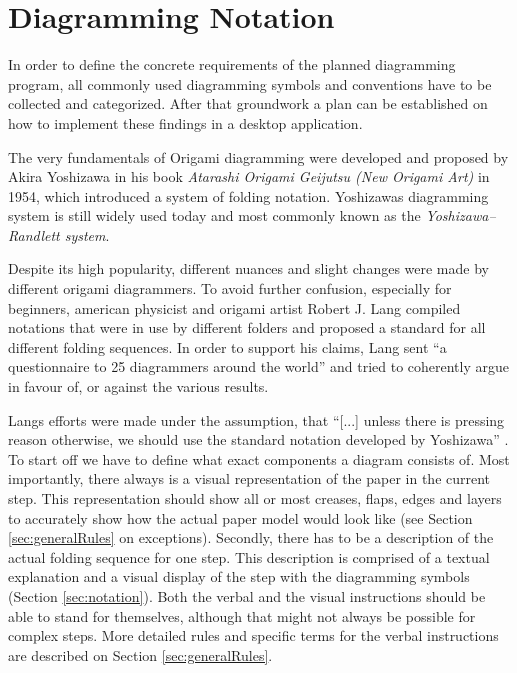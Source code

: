 
\section{Diagramming Notation}
\label{sec:conventions}


In order to define the concrete requirements of the planned diagramming program, all commonly used diagramming symbols and conventions have to be collected and categorized. After that groundwork a plan can be established on how to implement these findings in a desktop application.

The very fundamentals of Origami diagramming were developed and proposed by Akira Yoshizawa in his book \emph{Atarashi Origami Geijutsu (New Origami Art)}\cite{Yoshizawa} in 1954, which introduced a system of folding notation. Yoshizawas diagramming system is still widely used today and most commonly known as the  \emph{Yoshizawa–Randlett system}.

Despite its high popularity, different nuances and slight changes were made by different origami diagrammers.  To avoid further confusion, especially for beginners, american physicist and origami artist Robert J. Lang compiled notations that were in use by different folders and proposed a standard for all different folding sequences. In order to support his claims, Lang sent \enquote{a questionnaire to 25 diagrammers around the world}\cite{Lang} and tried to coherently argue in favour of, or against the various results.

Langs efforts were made under the assumption, that \enquote{[...] unless there is pressing reason otherwise, we should use the standard notation developed by Yoshizawa} \cite{Lang}.\\

To start off we have to define what exact components a diagram consists of. 
Most importantly, there always is a visual representation of the paper in the current step. This representation should show all or most creases, flaps, edges and layers to accurately show how the actual paper model would look like (see Section \ref{sec:generalRules} on exceptions).
Secondly, there has to be a description of the actual folding sequence for one step. This description is comprised of a textual explanation and a visual display of the step with the diagramming symbols (Section \ref{sec:notation}). Both the verbal and the visual instructions should be able to stand for themselves, although that might not always be possible for complex steps. More detailed rules and specific terms for the verbal instructions are described on Section \ref{sec:generalRules}.

